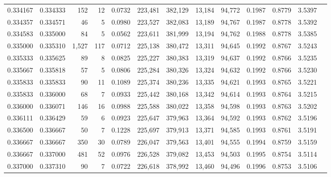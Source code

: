 \begin{tabular}{rrrrrrrrrrrrr}
0.334167 & 0.334333 &   152 &  12 &                                     0.0732 & 223,481 & 382,129 &  13,184 &  94,772 & 0.1987 & 0.8779 & 3.5397 \\
0.334357 & 0.334571 &    46 &   5 &                                     0.0980 & 223,527 & 382,083 &  13,189 &  94,767 & 0.1987 & 0.8778 & 3.5392 \\
0.334583 & 0.335000 &    84 &   5 &                                     0.0562 & 223,611 & 381,999 &  13,194 &  94,762 & 0.1988 & 0.8778 & 3.5385 \\
0.335000 & 0.335310 & 1,527 & 117 &                                     0.0712 & 225,138 & 380,472 &  13,311 &  94,645 & 0.1992 & 0.8767 & 3.5243 \\
0.335333 & 0.335625 &    89 &   8 &                                     0.0825 & 225,227 & 380,383 &  13,319 &  94,637 & 0.1992 & 0.8766 & 3.5235 \\
0.335667 & 0.335818 &    57 &   5 &                                     0.0806 & 225,284 & 380,326 &  13,324 &  94,632 & 0.1992 & 0.8766 & 3.5230 \\
0.335833 & 0.335833 &    90 &  11 &                                     0.1089 & 225,374 & 380,236 &  13,335 &  94,621 & 0.1993 & 0.8765 & 3.5221 \\
0.335833 & 0.336000 &    68 &   7 &                                     0.0933 & 225,442 & 380,168 &  13,342 &  94,614 & 0.1993 & 0.8764 & 3.5215 \\
0.336000 & 0.336071 &   146 &  16 &                                     0.0988 & 225,588 & 380,022 &  13,358 &  94,598 & 0.1993 & 0.8763 & 3.5202 \\
0.336111 & 0.336429 &    59 &   6 &                                     0.0923 & 225,647 & 379,963 &  13,364 &  94,592 & 0.1993 & 0.8762 & 3.5196 \\
0.336500 & 0.336667 &    50 &   7 &                                     0.1228 & 225,697 & 379,913 &  13,371 &  94,585 & 0.1993 & 0.8761 & 3.5191 \\
0.336667 & 0.336667 &   350 &  30 &                                     0.0789 & 226,047 & 379,563 &  13,401 &  94,555 & 0.1994 & 0.8759 & 3.5159 \\
0.336667 & 0.337000 &   481 &  52 &                                     0.0976 & 226,528 & 379,082 &  13,453 &  94,503 & 0.1995 & 0.8754 & 3.5114 \\
0.337000 & 0.337310 &    90 &   7 &                                     0.0722 & 226,618 & 378,992 &  13,460 &  94,496 & 0.1996 & 0.8753 & 3.5106 \\

\end{tabular}
